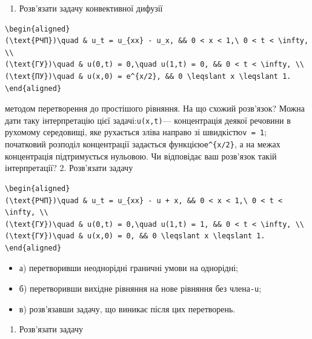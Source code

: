 \documentclass[
  ukrainian,
]{article}
\providecommand{\tightlist}{%
  \setlength{\itemsep}{0pt}\setlength{\parskip}{0pt}}
\begin{document}
\begin{enumerate}
\def\labelenumi{\arabic{enumi}.}
\tightlist
\item
  Розв'язати задачу конвективної дифузії
\end{enumerate}

\begin{verbatim}
\begin{aligned}
(\text{РЧП})\quad & u_t = u_{xx} - u_x, && 0 < x < 1,\ 0 < t < \infty, \\
(\text{ГУ})\quad & u(0,t) = 0,\quad u(1,t) = 0, && 0 < t < \infty, \\
(\text{ПУ})\quad & u(x,0) = e^{x/2}, && 0 \leqslant x \leqslant 1.
\end{aligned}
\end{verbatim}

методом перетворення до простішого рівняння. На що схожий розв'язок?
Можна дати таку інтерпретацію цієї задачі:\texttt{u(x,t)}---
концентрація деякої речовини в рухомому середовищі, яке рухається зліва
направо зі швидкістю\texttt{v\ =\ 1}; початковий розподіл концентрації
задається функцією\texttt{e\^{}\{x/2\}}, а на межах концентрація
підтримується нульовою. Чи відповідає ваш розв'язок такій інтерпретації?
2. Розв'язати задачу

\begin{verbatim}
\begin{aligned}
(\text{РЧП})\quad & u_t = u_{xx} - u + x, && 0 < x < 1,\ 0 < t < \infty, \\
(\text{ГУ})\quad & u(0,t) = 0,\quad u(1,t) = 1, && 0 < t < \infty, \\
(\text{ГУ})\quad & u(x,0) = 0, && 0 \leqslant x \leqslant 1.
\end{aligned}
\end{verbatim}

\begin{itemize}
\tightlist
\item
  а) перетворивши неоднорідні граничні умови на однорідні;
\item
  б) перетворивши вихідне рівняння на нове рівняння без
  члена\texttt{-u};
\item
  в) розв'язавши задачу, що виникає після цих перетворень.
\end{itemize}

\begin{enumerate}
\def\labelenumi{\arabic{enumi}.}
\setcounter{enumi}{2}
\tightlist
\item
  Розв'язати задачу
\end{enumerate}
\end{document}
